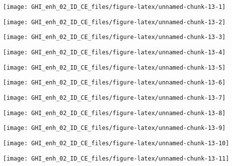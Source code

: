 \documentclass[
  10pt,
  a4paper,oneside]{article}
\begin{document}
\begin{center}\texttt{[image: GHI\_enh\_02\_ID\_CE\_files/figure-latex/unnamed-chunk-13-1]} \end{center}

\begin{center}\texttt{[image: GHI\_enh\_02\_ID\_CE\_files/figure-latex/unnamed-chunk-13-2]} \end{center}

\begin{center}\texttt{[image: GHI\_enh\_02\_ID\_CE\_files/figure-latex/unnamed-chunk-13-3]} \end{center}

\begin{center}\texttt{[image: GHI\_enh\_02\_ID\_CE\_files/figure-latex/unnamed-chunk-13-4]} \end{center}

\begin{center}\texttt{[image: GHI\_enh\_02\_ID\_CE\_files/figure-latex/unnamed-chunk-13-5]} \end{center}

\begin{center}\texttt{[image: GHI\_enh\_02\_ID\_CE\_files/figure-latex/unnamed-chunk-13-6]} \end{center}

\begin{center}\texttt{[image: GHI\_enh\_02\_ID\_CE\_files/figure-latex/unnamed-chunk-13-7]} \end{center}

\begin{center}\texttt{[image: GHI\_enh\_02\_ID\_CE\_files/figure-latex/unnamed-chunk-13-8]} \end{center}

\begin{center}\texttt{[image: GHI\_enh\_02\_ID\_CE\_files/figure-latex/unnamed-chunk-13-9]} \end{center}

\begin{center}\texttt{[image: GHI\_enh\_02\_ID\_CE\_files/figure-latex/unnamed-chunk-13-10]} \end{center}

\begin{center}\texttt{[image: GHI\_enh\_02\_ID\_CE\_files/figure-latex/unnamed-chunk-13-11]} \end{center}
\end{document}
